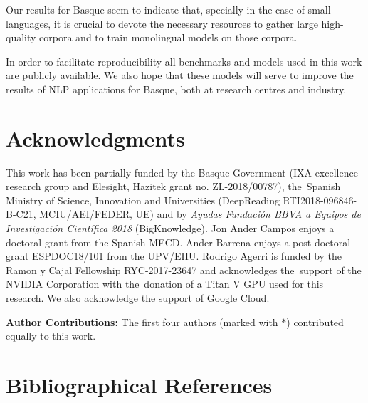 \documentclass[10pt, a4paper]{article}
\begin{document}
Our results for Basque seem to indicate that, specially in the case of small languages, it is crucial to devote the necessary resources to gather large high-quality corpora and to train monolingual models on those corpora.

In order to facilitate reproducibility all benchmarks and models used in this work are publicly available. We also hope that these models will serve to improve the results of NLP applications for Basque, both at research centres and industry.



\section{Acknowledgments}

This work has been partially funded by the Basque Government (IXA excellence research group and Elesight, Hazitek grant no. ZL-2018/00787), the~Spanish Ministry of Science, Innovation and Universities (DeepReading RTI2018-096846-B-C21, MCIU/AEI/FEDER, UE) and by \textit{Ayudas Fundación BBVA a Equipos de Investigación Científica 2018} (BigKnowledge).  Jon Ander Campos enjoys a doctoral grant from the Spanish MECD. Ander Barrena enjoys a post-doctoral grant ESPDOC18/101 from the UPV/EHU. Rodrigo Agerri is funded by the Ramon y Cajal Fellowship RYC-2017-23647 and acknowledges the~support of the NVIDIA Corporation with the~donation of a Titan V GPU used for this research. We also acknowledge the support of Google Cloud.

\vspace{0.5cm}

\noindent \textbf{Author Contributions:} The first four authors (marked with $*$) contributed equally to this work.

\section{Bibliographical References}



\end{document}

